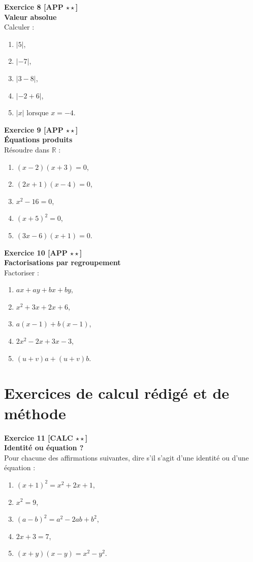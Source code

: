 \documentclass[11pt,a4paper]{article}
\begin{document}
\textbf{Exercice 8 [APP $\star\star$]}\\
\textbf{Valeur absolue}\\
Calculer :
\begin{enumerate}[label=\alph*)]
    \item $|5|$,
    \item $|-7|$,
    \item $|3-8|$,
    \item $|-2+6|$,
    \item $|x|$ lorsque $x=-4$.
\end{enumerate}

\textbf{Exercice 9 [APP $\star\star$]}\\
\textbf{Équations produits}\\
Résoudre dans $\mathbb{R}$ :
\begin{enumerate}[label=\alph*)]
    \item $(x-2)(x+3)=0$,
    \item $(2x+1)(x-4)=0$,
    \item $x^2-16=0$,
    \item $(x+5)^2=0$,
    \item $(3x-6)(x+1)=0$.
\end{enumerate}

\textbf{Exercice 10 [APP $\star\star$]}\\
\textbf{Factorisations par regroupement}\\
Factoriser :
\begin{enumerate}[label=\alph*)]
    \item $ax+ay+bx+by$,
    \item $x^2+3x+2x+6$,
    \item $a(x-1)+b(x-1)$,
    \item $2x^2-2x+3x-3$,
    \item $(u+v)a+(u+v)b$.
\end{enumerate}

\newpage

\section*{Exercices de calcul rédigé et de méthode}

\textbf{Exercice 11 [CALC $\star\star$]}\\
\textbf{Identité ou équation ?}\\
Pour chacune des affirmations suivantes, dire s’il s’agit d’une identité ou d’une équation :
\begin{enumerate}[label=\alph*)]
    \item $(x+1)^2=x^2+2x+1$,
    \item $x^2=9$,
    \item $(a-b)^2=a^2-2ab+b^2$,
    \item $2x+3=7$,
    \item $(x+y)(x-y)=x^2-y^2$.
\end{enumerate}
\end{document}
